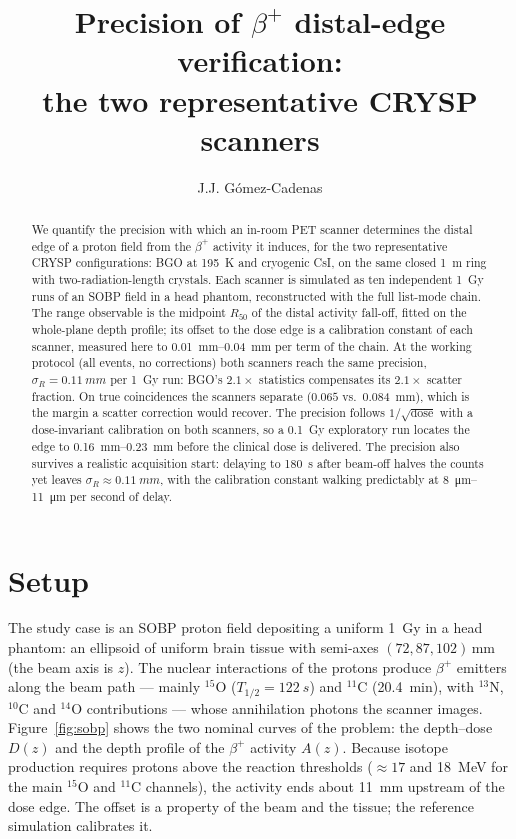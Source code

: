 \documentclass[11pt]{article}
\title{Precision of $\beta^+$ distal-edge verification:\\
  the two representative CRYSP scanners}
\author{J.J. G\'omez-Cadenas}
\date{\vspace{-3em}}
\newcommand{\Rfifty}{R_{50}}
\begin{document}
\maketitle

\begin{abstract}
We quantify the precision with which an in-room PET scanner determines the
distal edge of a proton field from the $\beta^+$ activity it induces, for
the two representative CRYSP configurations: BGO at \SI{195}{K} and
cryogenic CsI, on the same closed \SI{1}{m} ring with two-radiation-length
crystals. Each scanner is simulated as ten independent \SI{1}{Gy} runs of
an SOBP field in a head phantom, reconstructed with the full list-mode
chain. The range observable is the midpoint $\Rfifty$ of the distal
activity fall-off, fitted on the whole-plane depth profile; its offset to
the dose edge is a calibration constant of each scanner, measured here to
\SIrange{0.01}{0.04}{mm} per term of the chain. At the working protocol
(all events, no corrections) both scanners reach the same precision,
$\sigma_R = \SI{0.11}{mm}$ per \SI{1}{Gy} run: BGO's $2.1\times$
statistics compensates its $2.1\times$ scatter fraction. On true
coincidences the scanners separate ($0.065$ vs.\ \SI{0.084}{mm}), which is
the margin a scatter correction would recover. The precision follows
$1/\sqrt{\text{dose}}$ with a dose-invariant calibration on both scanners,
so a \SI{0.1}{Gy} exploratory run locates the edge to
\SIrange{0.16}{0.23}{mm} before the clinical dose is delivered. The
precision also survives a realistic acquisition start: delaying to
\SI{180}{s} after beam-off halves the counts yet leaves
$\sigma_R \approx \SI{0.11}{mm}$, with the calibration constant walking
predictably at \SIrange{8}{11}{\micro m} per second of delay.
\end{abstract}

\section{Setup}
\label{sec:setup}

The study case is an SOBP proton field depositing a uniform \SI{1}{Gy} in a
head phantom: an ellipsoid of uniform brain tissue with semi-axes
$(72, 87, 102)$\,mm (the beam axis is $z$). The nuclear interactions of the
protons produce $\beta^+$ emitters along the beam path --- mainly $^{15}$O
($T_{1/2}=\SI{122}{s}$) and $^{11}$C (\SI{20.4}{min}), with $^{13}$N,
$^{10}$C and $^{14}$O contributions --- whose annihilation photons the
scanner images. Figure~\ref{fig:sobp} shows the two nominal curves of the
problem: the depth--dose $D(z)$ and the depth profile of the $\beta^+$
activity $A(z)$. Because isotope production requires protons above the
reaction thresholds ($\approx 17$ and \SI{18}{MeV} for the main $^{15}$O
and $^{11}$C channels), the activity ends about \SI{11}{mm} upstream of the
dose edge. The offset is a property of the beam and the tissue; the
reference simulation calibrates it.
\end{document}
